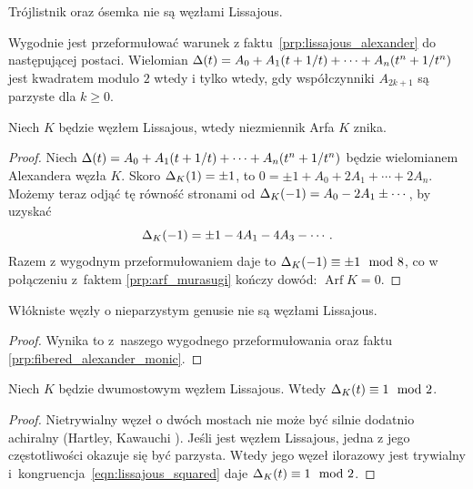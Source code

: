 \begin{example}
    Trójlistnik oraz ósemka nie są węzłami Lissajous.
\end{example}

Wygodnie jest przeformułować warunek z faktu~\ref{prp:lissajous_alexander} do następującej postaci.
Wielomian $\Delta(t) = A_0 + A_1(t+1/t) + \cdots + A_n(t^n + 1/t^n)$ jest kwadratem modulo $2$ wtedy i tylko wtedy, gdy współczynniki $A_{2k+1}$ są parzyste dla $k \ge 0$.

\begin{corollary}
%
    Niech $K$ będzie węzłem Lissajous, wtedy niezmiennik Arfa $K$ znika.
\end{corollary}

\begin{proof}
    Niech $\Delta(t) = A_0 + A_1(t+1/t) + \cdots + A_n(t^n + 1/t^n)$ będzie wielomianem Alexandera węzła $K$.
    Skoro $\Delta_K(1) = \pm 1$, to $0 = \pm 1 + A_0 + 2A_1 + \cdots + 2A_n$.
    Możemy teraz odjąć tę równość stronami od $\Delta_K(-1) = A_0 - 2A_1 \pm \cdots$, by uzyskać
    \begin{equation}
        \Delta_K(-1) = \pm 1 - 4A_1 - 4A_3 - \cdots.
    \end{equation}
    Razem z wygodnym przeformułowaniem daje to $\Delta_K(-1) \equiv \pm 1 \mod 8$, co w połączeniu z~faktem \ref{prp:arf_murasugi} kończy dowód: $\operatorname{Arf} K = 0$.
\end{proof}

\begin{corollary}
%
\label{cor:lissajous_fibered}%
    Włókniste węzły o nieparzystym genusie nie są węzłami Lissajous.
\end{corollary}

\begin{proof}
    Wynika to z~naszego wygodnego przeformułowania oraz faktu \ref{prp:fibered_alexander_monic}.
\end{proof}

\begin{corollary}
%
%
\label{cor:lissajous_twobridge}%
    Niech $K$ będzie dwumostowym węzłem Lissajous.
    Wtedy $\Delta_K(t) \equiv 1 \mod 2$.
\end{corollary}

\begin{proof}
    Nietrywialny węzeł o dwóch mostach nie może być silnie dodatnio achiralny (Hartley, Kawauchi \cite{hartley1979}).
    Jeśli jest węzłem Lissajous, jedna z jego częstotliwości okazuje się być parzysta.
    Wtedy jego węzeł ilorazowy jest trywialny i~kongruencja~\ref{eqn:lissajous_squared} daje $\Delta_K(t) \equiv 1 \mod 2$.
\end{proof}

